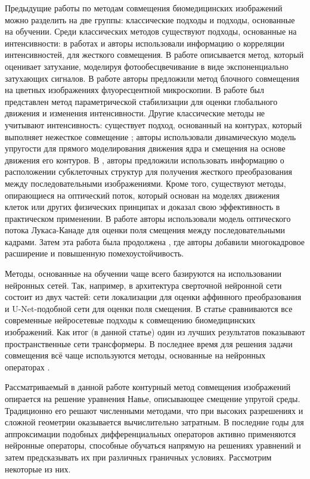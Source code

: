 \documentclass[12pt]{article}
\begin{document}
Предыдущие работы по методам совмещения биомедицинских изображений можно разделить на две группы: классические подходы и подходы, основанные на обучении. 
Среди классических методов существуют
подходы, основанные на интенсивности: в работах \cite{goobic2005}  и \cite{wilson2006} 
авторы использовали информацию о корреляции интенсивностей, для жесткого совмещения. В работе \cite{vandegiessen2011} описывается
метод, который оценивает затухание, моделируя фотообесцвечивание в виде экспоненциально затухающих сигналов. 
В работе \cite{raza2012}  авторы предложили метод блочного совмещения на цветных изображениях флуоресцентной микроскопии.
В работе \cite{ozere2013}  был представлен метод параметрической стабилизации для оценки глобального движения и изменения интенсивности.
Другие классические методы не учитывают интенсивность:
существует подход, основанный на контурах, который выполняет нежесткое совмещение \cite{sorokin2018} ; авторы использовали динамическую модель упругости для прямого моделирования движения ядра и
смещения на основе движения его контуров. В \cite{matula2006} , авторы предложили использовать информацию о расположении субклеточных структур для получения жесткого преобразования между последовательными
изображениями. Кроме того, существуют методы, опирающиеся на оптический поток, который основан
на моделях движения клеток или других физических принципах и доказал свою эффективность в практическом применении.
В работе \cite{kim2010}  авторы использовали модель оптического потока Лукаса-Канаде для оценки поля смещения между последовательными кадрами. 
Затем эта работа была продолжена \cite{tektonidis2015}, где авторы добавили
многокадровое расширение и повышенную помехоустойчивость. 


Методы, основанные на обучении чаще всего базируются на использовании нейронных сетей. Так, например, в \cite{anoshina2024} архитектура сверточной
нейронной сети состоит из двух частей: сети локализации для оценки аффинного преобразования и U-Net-подобной сети для оценки поля смещения. В статье \cite{boveiri2024} сравниваются все современные нейросетевые подходы к совмещению биомедицинских изображений. Как итог (в данной статье) один из лучших результатов показывают пространственные сети трансформеры. В последнее время для решения задачи совмещения всё чаще используются методы, основанные на нейронных операторах \cite{drozdovresolution}. 


Рассматриваемый в данной работе контурный метод совмещения изображений опирается на решение уравнения Навье, описывающее смещение упругой среды. Традиционно его решают численными методами, что при высоких разрешениях и сложной геометрии оказывается вычислительно затратным. В последние годы для аппроксимации подобных дифференциальных операторов активно применяются нейронные операторы, способные обучаться напрямую на решениях уравнений и затем предсказывать их при различных граничных условиях. Рассмотрим некоторые из них.
\end{document}
